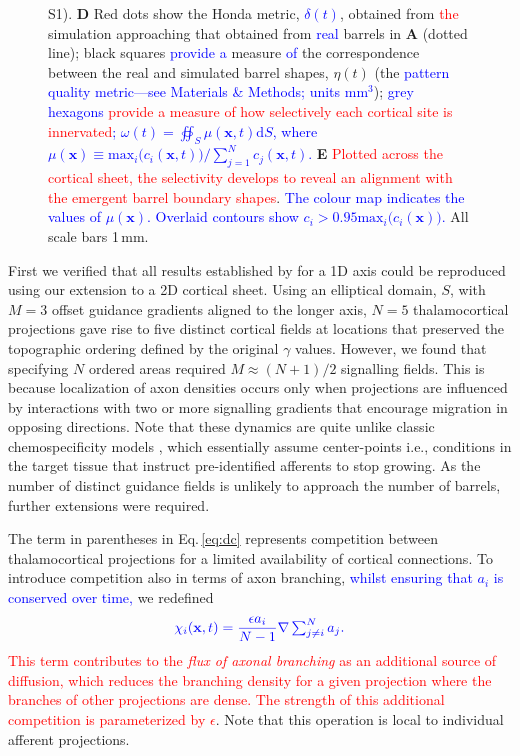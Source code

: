 \documentclass[9pt,lineno,draft]{elife}
\newcommand{\cmnt}[1]{\textcolor{blue}{#1}}
\newcommand{\stu}[1]{\textcolor{red}{#1}}
\newcommand{\mb}[1]{\mathbf{#1}}
\begin{document}
\begin{figure}
\begin{fullwidth}
{      S1). \textbf{D} Red dots show the Honda metric, \cmnt{$\delta(t)$}, obtained from \stu{the}
      simulation approaching that obtained from \cmnt{real} barrels in \textbf{A} (dotted
      line); black squares \cmnt{provide a} measure \cmnt{of} the correspondence
      between the real and
      simulated barrel shapes, $\eta(t)$ (the \cmnt{pattern quality metric---see
        Materials \& Methods; units mm$^3$});
      \cmnt{grey hexagons \stu{provide a measure of how selectively each
          cortical site is innervated};
        $\omega(t) = \oiint_{S} \mu(\mb{x},t) \mathrm{d}S$, where
        $\mu(\mb{x}) \equiv \mathrm{max}_i\big(c_i(\mb{x},t)\big)\big/\sum_{j=1}^{N} c_j(\mb{x},t)$.}
      \textbf{E} \stu{Plotted across the cortical sheet, the selectivity
        develops to reveal an alignment with the emergent barrel boundary
        shapes}. \cmnt{The colour map
        indicates the values of $\mu(\mb{x})$. Overlaid
        contours show $c_i > 0.95 \mathrm{max}_i\big(c_i(\mb{x})\big)$.} All scale bars 1\,mm.}
    \label{fig:main}
  \end{fullwidth}
\end{figure}

First we verified that all results established by \cite{karbowski_model_2004}
for a 1D axis could be reproduced using our extension to a 2D cortical
sheet. Using an elliptical domain, $S$, with $M=3$ offset guidance gradients
aligned to the longer axis, $N=5$ thalamocortical projections gave rise to
five distinct cortical fields at locations that preserved the topographic
ordering defined by the original $\gamma$ values. However, we found that
specifying $N$ ordered areas required $M\approx (N+1)/2$ signalling
fields. This is because localization of axon densities occurs only when
projections are influenced by interactions with two or more signalling
gradients that encourage migration in opposing directions. Note that these
dynamics are quite unlike classic chemospecificity models
\citep{sperry_chemoaffinity_1963}, which essentially assume center-points
i.e., conditions in the target tissue that instruct pre-identified afferents
to stop growing. As the number of distinct guidance fields is unlikely to
approach the number of barrels, further extensions were required.

The term in parentheses in Eq.\,\ref{eq:dc} represents competition between
thalamocortical projections for a limited availability of cortical
connections. To introduce competition also in terms of axon branching,
\cmnt{whilst ensuring that $a_i$ is conserved over time,} we
redefined
%
\begin{equation} \label{eq:comp}
  \color{blue}
  \chi_i(\mb{x}, t) = \frac{\epsilon a_i}{N-1} \nabla \textstyle\sum_{j\ne i}^{N}{a_j}.
  \color{black}
\end{equation}
%
\stu{This term contributes to the \emph{flux of axonal branching} as an
 additional source of diffusion, which reduces the branching density for a given projection where the branches of other projections are dense.} \stu{The strength of this additional competition is parameterized by $\epsilon$}. Note that this operation is local to individual afferent
projections.
\end{document}
